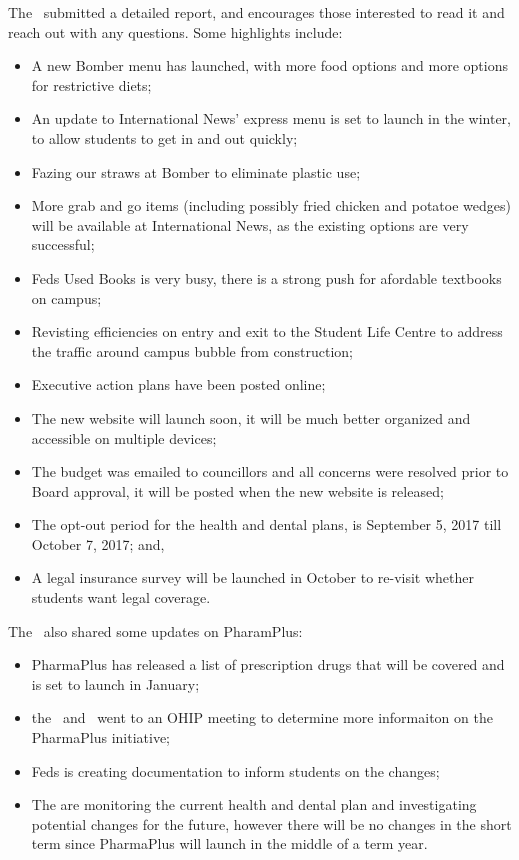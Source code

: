 \begin{information}

    The \vpof\ submitted a detailed report, and encourages those interested to
    read it and reach out with any questions. Some highlights include:
    \begin{itemize}
        \item A new Bomber menu has launched, with more food options and more 
            options for restrictive diets; 
        \item An update to International News' express menu is set to launch 
            in the winter, to allow students to get in and out quickly; 
        \item Fazing our straws at Bomber to eliminate plastic use; 
        \item More grab and go items (including possibly fried chicken and 
            potatoe wedges) will be available at International News, as the 
            existing options are very successful;
        \item Feds Used Books is very busy, there is a strong push for 
            afordable textbooks on campus;
        \item Revisting efficiencies on entry and exit to the Student Life
            Centre to address the traffic around campus bubble from 
            construction;
        \item Executive action plans have been posted online; 
        \item The new website will launch soon, it will be much better 
            organized and accessible on multiple devices;
        \item The budget was emailed to councillors and all concerns were 
            resolved prior to Board approval, it will be posted when the new 
            website is released;
        \item The opt-out period for the health and dental plans, is September
            5, 2017 till October 7, 2017; and,
        \item A legal insurance survey will be launched in October to re-visit
            whether students want legal coverage.            
    \end{itemize} 

    The \vpof\ also shared some updates on PharamPlus:
    \begin{itemize}
        \item PharmaPlus has released a list of prescription drugs that will be 
            covered and is set to launch in January;
        \item the \vpe\ and \vpof\ went to an OHIP meeting to determine more 
            informaiton on the PharmaPlus initiative; 
        \item Feds is creating documentation to inform students on the changes; 
        \item The are monitoring the current health and dental plan and 
            investigating potential changes for the future, however there
            will be no changes in the short term since PharmaPlus will launch 
            in the middle of a term year.
    \end{itemize}


\end{information}
